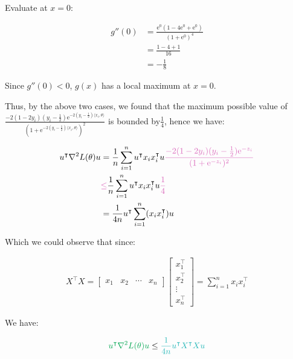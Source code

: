\documentclass{article}
\begin{document}
Evaluate at $x = 0$:

\begin{align*}
    g''(0) &= \frac{\mathrm{e}^0 (1 - 4\mathrm{e}^0 + \mathrm{e}^{0})}{(1 + \mathrm{e}^0)^4} \\
    &= \frac{1 - 4 + 1}{16} \\
    &= -\frac{1}{8}
\end{align*}

Since $g''(0) < 0$, $g(x)$ has a local maximum at $x = 0$.
\bigskip

Thus, by the above two cases, 
we found that the maximum possible value of 
$\frac{-2(1 - 2y_i)(y_i - \frac{1}{2})\mathrm{e}^{-2(y_i - \frac{1}{2})\langle x_i, \theta \rangle}}{(1 +\mathrm{e}^{-2(y_i - \frac{1}{2})\langle x_i, \theta \rangle})^2}$ 
is bounded by$\frac{1}{4}$, hence we have:

\begin{align*}
    u^\intercal \nabla^2 L (\theta) u 
    &= \frac{1}{n} \sum_{i = 1}^n u^\intercal x_i x_i^\intercal u \textcolor{Thistle}{\frac{-2(1 - 2y_i)(y_i - \frac{1}{2})\mathrm{e}^{-z_i}}{(1 +\mathrm{e}^{-z_i})^2}} \\
    &\textcolor{Thistle}{\leq} \frac{1}{n} \sum_{i = 1}^n u^\intercal x_i x_i^\intercal u \textcolor{Thistle}{\frac{1}{4}} \\
    &= \frac{1}{4n} u^\intercal \sum_{i=1}^n (x_i x_i^\intercal) u \\
\end{align*}

Which we could observe that since:

\begin{align*}
    X^\intercal X 
    = \begin{bmatrix}
        x_1 & x_2 & \cdots & x_n
    \end{bmatrix}
    \begin{bmatrix}
        x_1^\intercal \\ x_2^\intercal \\ \vdots \\ x_n^\intercal
    \end{bmatrix}
    = \sum_{i=1}^n x_i x_i^\intercal
\end{align*}

We have:

\begin{align*}
    \textcolor{Green}{u^\intercal \nabla^2 L (\theta) u} 
    &\leq \textcolor{BlueGreen}{\frac{1}{4n} u^\intercal X^\intercal X u} \\
\end{align*}
\end{document}
